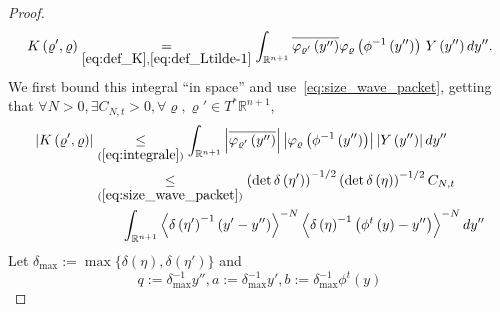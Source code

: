\documentclass[10pt]{amsart}
\theoremstyle{definition}\newtheorem{defi}[theo]{Definition}\newtheorem{rema}[theo]{Remark}\newtheorem{exam}[theo]{Example}\newtheorem{exem}[theo]{Example}\newtheorem{nota}[theo]{Notation}
\newcommand*\ineq[1]{\underset{(#1)}{\leq}}
\newcommand{\bbR}{\mathbb{R}}
\let\oldexists\exists
\renewcommand*{\exists}{\mathrel{\oldexists}}
\let\oldforall\forall
\renewcommand*{\forall}{\mathrel{\oldforall}}
\begin{document}
\begin{proof}
\begin{align}\label{eq:integrale}
K\left(\varrho',\varrho\right) \underset{\eqref{eq:def_K},\eqref{eq:def_Ltilde-1}}{=}\int_{\bbR^{n+1}}\overline{\varphi_{\varrho'}\left(y''\right)}\varphi_{\varrho}\left(\phi^{-1}\left(y''\right)\right)\,Y\left(y''\right)dy''.
\end{align}
We first bound this integral ``in space'' and use~\eqref{eq:size_wave_packet}, getting that $\forall N>0,\exists C_{N,t}>0,\forall\varrho,\varrho'\in T^{*}\bbR^{n+1}$,
\begin{align}
\left|K\left(\varrho',\varrho\right)\right| & \ineq{\ref{eq:integrale}}\int_{\bbR^{n+1}}\left|\overline{\varphi_{\varrho'}\left(y''\right)}\right|\left|\varphi_{\varrho}\left(\phi^{-1}\left(y''\right)\right)\right|\left|Y\left(y''\right)\right|dy''\label{eq:integrale-1}
\\
& \ineq{\ref{eq:size_wave_packet}}\left(\det \delta\left(\eta'\right)\right)^{-1/2}\left(\det \delta\left(\eta\right)\right)^{-1/2}C_{N,t}\nonumber\\
& \qquad\int_{\bbR^{n+1}}\left\langle \delta\left(\eta'\right)^{-1}\left(y'-y''\right)\right\rangle ^{-N}\left\langle \delta\left(\eta\right)^{-1}\left(\phi^{t}\left(y\right)-y''\right)\right\rangle ^{-N}dy''\label{eq:integrand}\nonumber
\end{align}
Let $\delta_{\max}:=\max\{\delta(\eta),\delta(\eta')\} $ and
\[
q:=\delta_{\max}^{-1}y'',a:=\delta_{\max}^{-1}y',b:=\delta_{\max}^{-1}\phi^{t}\left(y\right)
\]


\end{proof}
\end{document}
